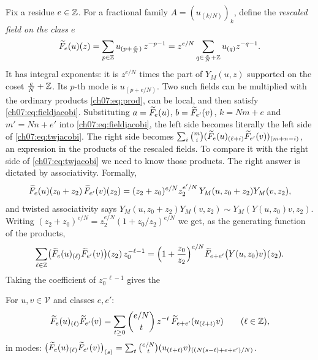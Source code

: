 Fix a residue $e\in{\mathbb{Z}}$. For a fractional family $A = (u_{(k/N)})_{k}$, define the
\emph{rescaled field on the class $e$}
\begin{equation}\label{ch07:eq:resc}
  \widetilde{F}_e(u)(z) = \sum_{p\in{\mathbb{Z}}} u_{(p+\frac eN)}\,z^{-p-1}
  = z^{e/N}\sum_{q\in \frac eN+{\mathbb{Z}}}u_{(q)}z^{-q-1}.
\end{equation}
It has integral exponents: it is $z^{e/N}$ times the part of $Y_M(u,z)$ supported on the coset
$\frac eN+{\mathbb{Z}}$. Its $p$-th mode is $u_{(p+e/N)}$. Two such fields can be multiplied with the
ordinary products \eqref{ch07:eq:prod}, can be local, and then satisfy \eqref{ch07:eq:fieldjacobi}.
Substituting $a = \widetilde{F}_e(u)$, $b=\widetilde{F}_{e'}(v)$, $k = Nm+e$ and $m' = Nn+e'$ into
\eqref{ch07:eq:fieldjacobi}, the left side becomes literally the left side of
\eqref{ch07:eq:twjacobi}. The right side becomes $\sum_i\binom mi
(\widetilde{F}_e(u)_{(\ell+i)}\widetilde{F}_{e'}(v))_{(m+n-i)}$, an expression in the products of the
rescaled fields. To compare it with the right side of \eqref{ch07:eq:twjacobi} we need to know
those products. The right answer is dictated by associativity. Formally,
\begin{equation*}
  \widetilde{F}_e(u)(z_0+z_2)\,\widetilde{F}_{e'}(v)(z_2) = (z_2+z_0)^{e/N}z_2^{e'/N}\,Y_M(u,z_0+z_2)
  Y_M(v,z_2),
\end{equation*}
and twisted associativity says $Y_M(u,z_0+z_2)Y_M(v,z_2)\sim Y_M(Y(u,z_0)v,z_2)$. Writing
$(z_2+z_0)^{e/N} = z_2^{e/N}(1+z_0/z_2)^{e/N}$ we get, as the generating function of the
products,
\begin{equation}\label{ch07:eq:pfgen}
  \sum_{\ell\in{\mathbb{Z}}}\bigl(\widetilde{F}_e(u)_{(\ell)}\widetilde{F}_{e'}(v)\bigr)(z_2)\,z_0^{-\ell-1}
  = \Bigl(1+\frac{z_0}{z_2}\Bigr)^{e/N}\widetilde{F}_{e+e'}\bigl(Y(u,z_0)v\bigr)(z_2).
\end{equation}
Taking the coefficient of $z_0^{-\ell-1}$ gives the

\begin{definition}\label{ch07:def:pf}
For $u,v\in\mathcal V$ and classes $e,e'$:
\begin{equation}\label{ch07:eq:pf}
  \widetilde{F}_e(u)_{(\ell)}\widetilde{F}_{e'}(v) = \sum_{t\ge0}\binom{e/N}{t}\,z^{-t}\,
  \widetilde{F}_{e+e'}(u_{(\ell+t)}v)\qquad(\ell\in{\mathbb{Z}}),
\end{equation}
in modes: $\bigl(\widetilde{F}_e(u)_{(\ell)}\widetilde{F}_{e'}(v)\bigr)_{(s)} = \sum_t\binom{e/N}{t}
(u_{(\ell+t)}v)_{((N(s-t)+e+e')/N)}$.
\end{definition}

